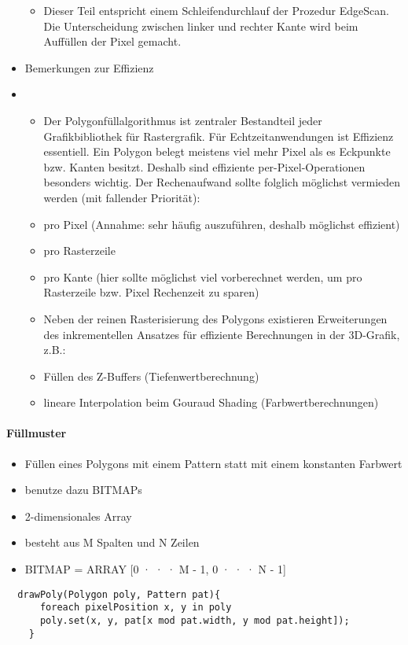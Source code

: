 \documentclass[10pt,landscape]{article}
\begin{document}
\begin{multicols}{3}
\begin{itemize}
\begin{itemize}
            \item  Dieser Teil entspricht einem Schleifendurchlauf der Prozedur EdgeScan. Die Unterscheidung zwischen linker und rechter Kante wird beim Auffüllen der Pixel gemacht.
          \end{itemize}
    \item Bemerkungen zur Effizienz
    \item \begin{itemize}
            \item Der Polygonfüllalgorithmus ist zentraler Bestandteil jeder Grafikbibliothek für Rastergrafik. Für Echtzeitanwendungen ist Effizienz essentiell. Ein Polygon belegt
                  meistens viel mehr Pixel als es Eckpunkte bzw. Kanten besitzt. Deshalb sind effiziente per-Pixel-Operationen besonders wichtig. Der Rechenaufwand sollte folglich möglichst vermieden werden (mit fallender Priorität):
            \item  pro Pixel (Annahme: sehr häufig auszuführen, deshalb möglichst effizient)
            \item  pro Rasterzeile
            \item  pro Kante (hier sollte möglichst viel vorberechnet werden, um pro Rasterzeile bzw. Pixel Rechenzeit zu sparen)
            \item Neben der reinen Rasterisierung des Polygons existieren Erweiterungen des inkrementellen Ansatzes für effiziente Berechnungen in der 3D-Grafik, z.B.:
            \item Füllen des Z-Buffers (Tiefenwertberechnung)
            \item lineare Interpolation beim Gouraud Shading (Farbwertberechnungen)
          \end{itemize}
  \end{itemize}
  
  \paragraph{Füllmuster}
  \begin{itemize}
    \item Füllen eines Polygons mit einem Pattern statt mit einem konstanten Farbwert
    \item benutze dazu BITMAPs
    \item 2-dimensionales Array
    \item besteht aus M Spalten und N Zeilen
    \item BITMAP = ARRAY [0 · · · M - 1, 0 · · · N - 1]
  \end{itemize}
  \begin{lstlisting}
  drawPoly(Polygon poly, Pattern pat){
      foreach pixelPosition x, y in poly
      poly.set(x, y, pat[x mod pat.width, y mod pat.height]);
    }
  \end{lstlisting}
  

\end{multicols}
\end{document}
